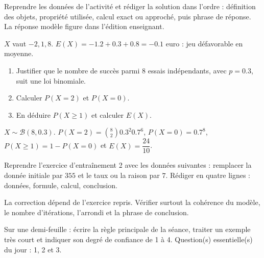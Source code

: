 \begin{example}
Reprendre les données de l'activité et rédiger la solution dans l'ordre : définition des objets, propriété utilisée, calcul exact ou approché, puis phrase de réponse. La réponse modèle figure dans l'édition enseignant.
\end{example}
\begin{solution}$X$ vaut $-2,1,8$. $E(X)=-\num{1,2}+\num{0,3}+\num{0,8}=-\num{0,1}$ euro : jeu défavorable en moyenne.\end{solution}

\begin{exercise}[essentiel]
\begin{enumerate}\item Justifier que le nombre de succès parmi $8$ essais indépendants, avec $p=\num{0,3}$, suit une loi binomiale.\item Calculer $P(X=2)$ et $P(X=0)$.\item En déduire $P(X\geq1)$ et calculer $E(X)$.\end{enumerate}
\end{exercise}
\begin{solution}$X\sim\mathcal B(8,\num{0,3})$. $P(X=2)=\binom{8}2 \num{0,3}^2 \num{0,7}^{6}$, $P(X=0)=\num{0,7}^{8}$, $P(X\geq1)=1-P(X=0)$ et $E(X)=\dfrac{24}{10}$.\end{solution}


\begin{homework}Reprendre l'exercice d'entraînement 2 avec les données suivantes : remplacer la donnée initiale par $355$ et le taux ou la raison par $7$. Rédiger en quatre lignes : données, formule, calcul, conclusion.\end{homework}
\begin{solution}La correction dépend de l'exercice repris. Vérifier surtout la cohérence du modèle, le nombre d'itérations, l'arrondi et la phrase de conclusion.\end{solution}

\begin{exitticket}[3 minutes]Sur une demi-feuille : écrire la règle principale de la séance, traiter un exemple très court et indiquer son degré de confiance de 1 à 4. Question(s) essentielle(s) du jour : 1, 2 et 3.\end{exitticket}

